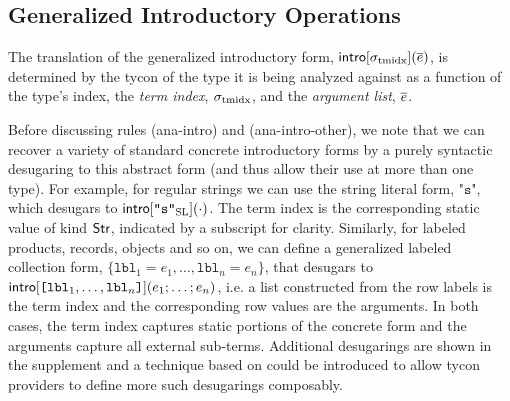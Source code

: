 \documentclass[10pt,preprint]{sigplanconf}
\begin{document}
\subsection{Generalized Introductory Operations}\label{sec:introop}
The translation of the generalized introductory form, ${\sf intro}[\sigma_\text{tmidx}](\overline{e})$, is determined by the tycon of the type it is being analyzed against as a function of the type's index, the \emph{term index}, $\sigma_\text{tmidx}$, and the \emph{argument list}, $\overline{e}$.

Before discussing rules (ana-intro) and (ana-intro-other), we note that we can recover a variety of standard concrete introductory forms by a purely syntactic desugaring to this abstract form (and thus allow their use at more than one type). For example, for regular strings we can use the string literal form, $\texttt{"s"}$, which desugars to ${\sf intro}[\texttt{"s"}_\text{SL}](\cdot)$. The term index is the corresponding static value of kind ${\sf Str}$, indicated by a subscript for clarity. Similarly, for labeled products, records, objects and so on, we can define a generalized labeled collection form, $\{\mathtt{lbl}_1=e_1, \ldots, \mathtt{lbl}_n=e_n\}$, that desugars to ${\sf intro}[\texttt{[}\mathtt{lbl}_1, \ldots, \mathtt{lbl}_n\texttt{]}](e_1; \ldots; e_n)$, i.e. a list constructed from the row labels is the term index and the corresponding row values are the arguments. In both cases, the term index captures  static portions of the concrete form and the arguments capture all external sub-terms. Additional desugarings are shown in the supplement and a technique based on \cite{TSLs} could be introduced to allow tycon providers to define more such desugarings  composably. 
\end{document}
